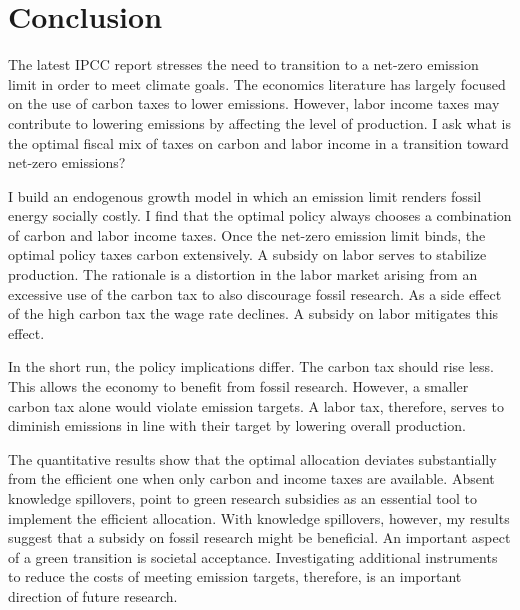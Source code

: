 \section{Conclusion}\label{sec:con3}
The latest IPCC report \citep{IPCC2022} stresses the need to transition to a net-zero emission limit in order to meet climate goals. The economics literature has largely focused on the use of carbon taxes to lower emissions.  However, labor income taxes may contribute to lowering emissions by affecting the level of production. I ask what is the optimal fiscal mix of taxes on carbon and labor income in a transition toward net-zero emissions?

I build an endogenous growth model in which an emission limit renders fossil energy socially costly. I find that the optimal policy always chooses a combination of carbon and labor income taxes. Once the net-zero emission limit binds, the optimal policy taxes carbon extensively. A subsidy on labor serves to stabilize production.
The rationale is a distortion in the labor market arising from an excessive use of the carbon tax to also discourage fossil research. As a side effect of the high carbon tax the wage rate declines.  A subsidy on labor mitigates this effect.

In the short run, the policy implications differ.  
The carbon tax should rise less. This allows the economy to benefit from fossil research. However, a smaller carbon tax alone would violate emission targets. A labor tax, therefore, serves to diminish emissions in line with their target by lowering overall production.

The quantitative results show that the optimal allocation deviates substantially from the efficient one when only carbon and income taxes are available. Absent knowledge spillovers, \cite{Acemoglu2012TheChange} point to green research subsidies as an essential tool to implement the efficient allocation. With knowledge spillovers, however, my results suggest that a subsidy on fossil research might be beneficial. An important aspect of a green transition is societal acceptance. Investigating additional instruments to reduce the costs of meeting emission targets, therefore, is an important direction of future research.

\clearpage

